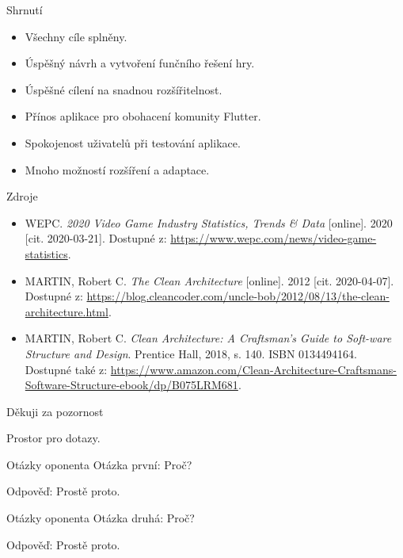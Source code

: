 \documentclass[czech,aspectratio=169]{beamer}
\begin{document}
  \begin{frame}{Shrnutí}
    \begin{itemize}
      \item Všechny cíle splněny.
      \item Úspěšný návrh a vytvoření funčního řešení hry.
      \item Úspěšné cílení na snadnou rozšířitelnost.
      \item Přínos aplikace pro obohacení komunity Flutter.
      \item Spokojenost uživatelů při testování aplikace.
      \item Mnoho možností rozšíření a adaptace.
    \end{itemize}
  \end{frame}

  \begin{frame}{Zdroje}
    \begin{itemize}
      \item WEPC. \emph{2020 Video Game Industry Statistics, Trends \& Data} [online]. 2020 [cit. 2020-03-21]. Dostupné z: \url{https://www.wepc.com/news/video-game-statistics}.
      \item MARTIN, Robert C. \emph{The Clean Architecture} [online]. 2012 [cit. 2020-04-07]. Dostupné z: \url{https://blog.cleancoder.com/uncle-bob/2012/08/13/the-clean-architecture.html}.
      \item MARTIN, Robert C. \emph{Clean Architecture: A Craftsman’s Guide to Soft-ware Structure and Design}. Prentice Hall, 2018, s. 140. ISBN 0134494164. Dostupné také z: \url{https://www.amazon.com/Clean-Architecture-Craftsmans-Software-Structure-ebook/dp/B075LRM681}. 
    \end{itemize}
  \end{frame}

  \begin{frame}{Děkuji za pozornost}
    \begin{center}
      Prostor pro dotazy.
    \end{center}
  \end{frame}

  \begin{frame}[noframenumbering]{Otázky oponenta}
    Otázka první: Proč?

    \vfill

    Odpověď: Prostě proto.
  \end{frame}

  \begin{frame}[noframenumbering]{Otázky oponenta}
    Otázka druhá: Proč?

    \vfill

    Odpověď: Prostě proto.
  \end{frame}
\end{document}
